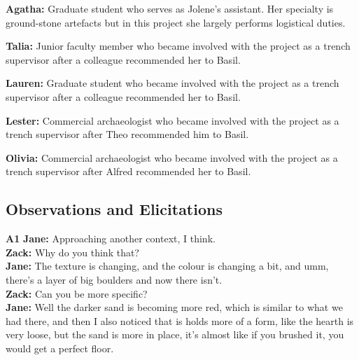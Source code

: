\documentclass{article}
\begin{document}
\noindent\textbf{Agatha:} Graduate student who serves as Jolene's assistant. Her
specialty is ground-stone artefacts but in this project she largely
performs logistical duties.\newline

\noindent\textbf{Talia:} Junior faculty member who became involved with the
project as a trench supervisor after a colleague recommended her to
Basil.\newline

\noindent\textbf{Lauren:} Graduate student who became involved with the project
as a trench supervisor after a colleague recommended her to Basil.\newline

\noindent\textbf{Lester:} Commercial archaeologist who became involved with the
project as a trench supervisor after Theo recommended him to Basil.\newline

\noindent\textbf{Olivia:} Commercial archaeologist who became involved with the
project as a trench supervisor after Alfred recommended her to Basil.\newline

\subsection{Observations and Elicitations}\label{observations-and-elicitations}

\textbf{A1}\label{sec-A1}\newline
\textbf{Jane:} Approaching another context, I think.\\
\textbf{Zack:} Why do you think that?\\
\textbf{Jane:} The texture is changing, and the colour is changing a
bit, and umm, there's a layer of big boulders and now there isn't.\\
\textbf{Zack:} Can you be more specific?\\
\textbf{Jane:} Well the darker sand is becoming more red, which is
similar to what we had there, and then I also noticed that is holds more
of a form, like the hearth is very loose, but the sand is more in place,
it's almost like if you brushed it, you would get a perfect floor.\newline
\end{document}
